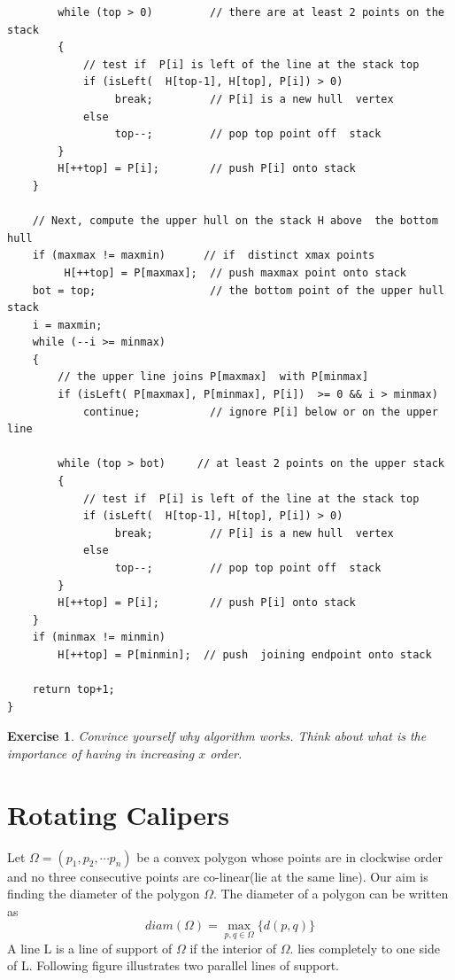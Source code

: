 \documentclass[12pt]{article}
\newtheorem{exercise}{Exercise}[section]
\begin{document}
\begin{lstlisting}
        while (top > 0)         // there are at least 2 points on the stack
        {
            // test if  P[i] is left of the line at the stack top
            if (isLeft(  H[top-1], H[top], P[i]) > 0)
                 break;         // P[i] is a new hull  vertex
            else
                 top--;         // pop top point off  stack
        }
        H[++top] = P[i];        // push P[i] onto stack
    }

    // Next, compute the upper hull on the stack H above  the bottom hull
    if (maxmax != maxmin)      // if  distinct xmax points
         H[++top] = P[maxmax];  // push maxmax point onto stack
    bot = top;                  // the bottom point of the upper hull stack
    i = maxmin;
    while (--i >= minmax)
    {
        // the upper line joins P[maxmax]  with P[minmax]
        if (isLeft( P[maxmax], P[minmax], P[i])  >= 0 && i > minmax)
            continue;           // ignore P[i] below or on the upper line

        while (top > bot)     // at least 2 points on the upper stack
        {
            // test if  P[i] is left of the line at the stack top
            if (isLeft(  H[top-1], H[top], P[i]) > 0)
                 break;         // P[i] is a new hull  vertex
            else
                 top--;         // pop top point off  stack
        }
        H[++top] = P[i];        // push P[i] onto stack
    }
    if (minmax != minmin)
        H[++top] = P[minmin];  // push  joining endpoint onto stack

    return top+1;
}
\end{lstlisting}

\begin{exercise}
  Convince yourself why algorithm works. 
  Think about what is the importance of having in increasing $x$ order.
\end{exercise}

\section{Rotating Calipers}

Let $\Omega = (p_1, p_2, \cdots p_n)$ be a convex polygon whose points are in clockwise order
and no three consecutive points are co-linear(lie at the same line). Our aim is finding
the diameter of the polygon $\Omega$. The diameter of a polygon can be written as
$$ diam(\Omega) = \max_{p,q \in \Omega}\{d(p,q)\} $$ 
A line L is a line of support of $\Omega$ if the interior of $\Omega$. lies completely to one side
of L. Following figure illustrates two parallel lines of support. 
\end{document}
